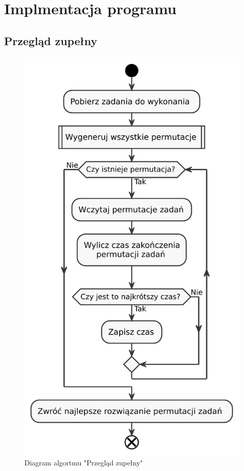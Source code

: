 \chapter{Implmentacja programu}

\section{Przegląd zupełny}

\begin{figure}[H]
    \centering
    \includegraphics[scale=0.7]{chapters/chapter4/brute_force.pdf}
    \caption{Diagram algortmu "Przegląd zupełny"}
    \label{brute_force}
\end{figure}

